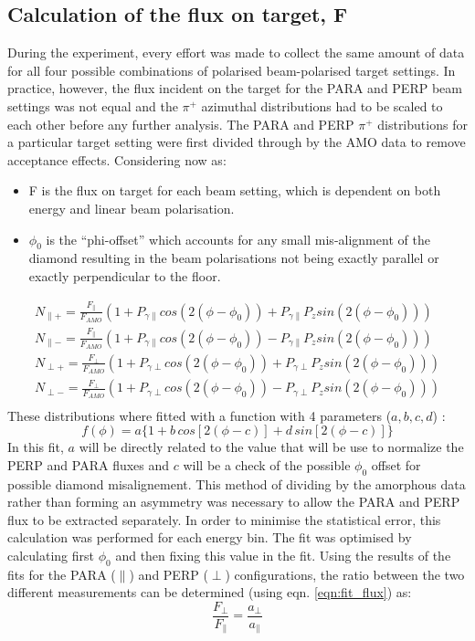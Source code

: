 \subsection{Calculation of the flux on target, F}
During the experiment, every effort was made to collect the same amount of data for all four possible combinations of polarised beam-polarised target settings. In practice, however, the flux incident on the target for the PARA and PERP beam settings was not equal and the $\pi^+$ azimuthal distributions had to be scaled to each other before any further analysis.
The PARA and PERP $\pi^+$ distributions for a particular target setting were first divided through by the AMO data to remove acceptance effects.
Considering now as:
\begin{itemize}
\item F is the flux on target for each beam setting, which is dependent on both energy and linear beam polarisation. 
\item $\phi_0$ is the “phi-offset” which accounts for any small mis-alignment of the diamond resulting in the beam polarisations not being exactly parallel or exactly perpendicular to the floor.
\end{itemize}

\begin{eqnarray}
N_{\parallel +} = \frac{F_{\parallel}}{F_{AMO}} \left( 1 + P_{\gamma \parallel}cos(2(\phi-\phi_0)) + P_{\gamma \parallel} P_z sin(2(\phi-\phi_0)) \right) \\
N_{\parallel -} = \frac{F_{\parallel}}{F_{AMO}} \left( 1 + P_{\gamma \parallel}cos(2(\phi-\phi_0)) - P_{\gamma \parallel} P_z sin(2(\phi-\phi_0)) \right) \\
N_{\perp +} = \frac{F_{\perp}}{F_{AMO}} \left( 1 + P_{\gamma \perp}cos(2(\phi-\phi_0)) + P_{\gamma \perp} P_z sin(2(\phi-\phi_0)) \right) \\
N_{\perp -} = \frac{F_{\perp}}{F_{AMO}} \left( 1 + P_{\gamma \perp}cos(2(\phi-\phi_0)) - P_{\gamma \perp} P_z sin(2(\phi-\phi_0)) \right) \\
\end{eqnarray}
These distributions where fitted with a function with 4 parameters ($ a,b,c,d $) :
\begin{equation} \label{eqn:fit_flux}
f(\phi) = a \{ 1 + b\, cos[2 (\phi - c) ]  + d\, sin[2(\phi - c)] \} 
\end{equation}
In this fit, $a$ will be directly related to the value that will be use to normalize the PERP and PARA fluxes and $c$ will be a check of the possible $\phi_0$ offset for possible diamond misalignement.
This method of dividing by the amorphous data rather than forming an asymmetry was necessary to allow the PARA and PERP flux to be extracted separately. In order to minimise the statistical error, this calculation was performed for each energy bin. The fit was optimised by calculating first $\phi_0$ and then fixing this value in the fit. 
Using the results of the fits for the PARA ($\parallel$) and PERP ($\perp$) configurations, the ratio between the two different measurements can be determined (using eqn. \ref{eqn:fit_flux}) as:
\begin{equation}
\frac{F_{\perp}}{F_{\parallel}} = \frac{a_{\perp}}{a_{\parallel}}
\end{equation}

